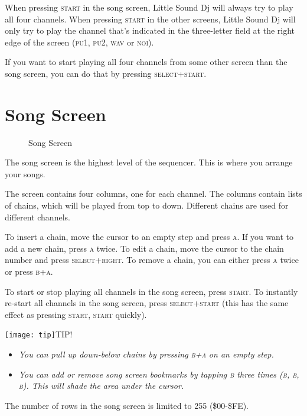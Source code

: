 When pressing \textsc{start} in the song screen, Little Sound Dj will always try to play all four
channels. When pressing \textsc{start} in the other screens, Little Sound Dj will only try to play the
channel that's indicated in the three-letter field at the right edge of the screen (\textsc{pu1}, \textsc{pu2}, \textsc{wav} or \textsc{noi}).

If you want to start playing all four channels from some other screen than the song screen,
you can do that by pressing \textsc{select+start}.

\section{Song Screen}

\begin{figure}[hbtp]
\centering
{}
\caption{Song Screen}
\end{figure}

The song screen
is the highest level of the sequencer. This is where you arrange your songs.

The screen contains four columns, one for each channel. The columns contain lists of chains, which will be played from top to down. Different chains are used for different channels.

To insert a chain, move the cursor to an empty step and press \textsc{a}. If you want to add a new
chain, press \textsc{a} twice. To edit a chain, move the cursor to the chain number and press
\textsc{select+right}. To remove a chain, you can either press \textsc{a} twice or
press \textsc{b+a}.

To start or stop playing all channels in the song screen, press \textsc{start}. To instantly re-start all channels in the song screen, press \textsc{select+start} (this has the same effect as pressing \textsc{start, start} quickly).

\texttt{[image: tip]}TIP!
\begin{itemize}
\item \textit{You can pull up down-below chains by pressing \textsc{b+a} on an empty step.}
\item \textit{You can add or remove song screen bookmarks by tapping \textsc{b} three times \textsc{(b, b, b)}. This will shade the area under the cursor.}
\end{itemize}

The number of rows in the song screen is limited to 255 (\$00-\$FE).


